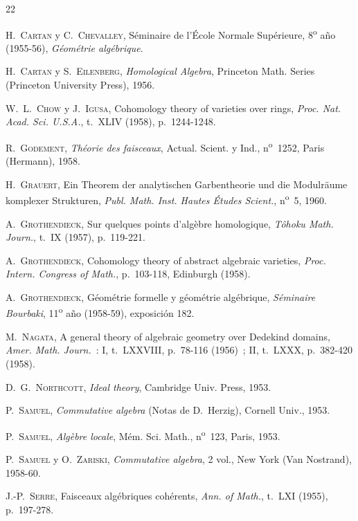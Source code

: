 \begin{thebibliography}{22}

H.~\textsc{Cartan} y C.~\textsc{Chevalley},
Séminaire de l'École Normale Supérieure,
8\textsuperscript{o} año (1955-56), \emph{Géométrie algébrique}.

H.~\textsc{Cartan} y S.~\textsc{Eilenberg},
\emph{Homological Algebra}, Princeton Math. Series (Princeton University
Press), 1956.

W.~L.~\textsc{Chow} y J.~\textsc{Igusa},
Cohomology theory of varieties over rings,
\emph{Proc. Nat. Acad. Sci. U.S.A.}, t.~XLIV (1958), p.~1244-1248.

R.~\textsc{Godement}, \emph{Théorie des faisceaux}, Actual. Scient. y Ind.,
n\textsuperscript{o}~1252, Paris (Hermann), 1958.

H.~\textsc{Grauert},
Ein Theorem der analytischen Garbentheorie und die Modulräume komplexer
Strukturen, \emph{Publ. Math. Inst. Hautes Études Scient.},
n\textsuperscript{o}~5, 1960.

A.~\textsc{Grothendieck}, Sur quelques points d'algèbre homologique,
\emph{Tôhoku Math. Journ.}, t.~IX (1957), p.~119-221.

A.~\textsc{Grothendieck},
Cohomology theory of abstract algebraic varieties,
\emph{Proc. Intern. Congress of Math.}, p.~103-118, Edinburgh (1958).

A.~\textsc{Grothendieck},
Géométrie formelle y géométrie algébrique,
\emph{Séminaire Bourbaki}, 11\textsuperscript{o} año (1958-59), exposición 182.

M.~\textsc{Nagata},
A general theory of algebraic geometry over Dedekind domains,
\emph{Amer. Math. Journ.}~: I, t.~LXXVIII, p.~78-116 (1956)~; II, t.~LXXX,
p.~382-420 (1958).

D.~G.~\textsc{Northcott}, \emph{Ideal theory}, Cambridge Univ. Press, 1953.

P.~\textsc{Samuel}, \emph{Commutative algebra} (Notas de D.~Herzig), Cornell
Univ., 1953.

P.~\textsc{Samuel}, \emph{Algèbre locale}, Mém. Sci. Math.,
n\textsuperscript{o}~123, Paris, 1953.

P.~\textsc{Samuel} y O.~\textsc{Zariski},
\emph{Commutative algebra}, 2 vol., New York (Van Nostrand), 1958-60.

J.-P.~\textsc{Serre}, Faisceaux algébriques cohérents,
\emph{Ann. of Math.}, t.~LXI (1955), p.~197-278.


\end{thebibliography}
